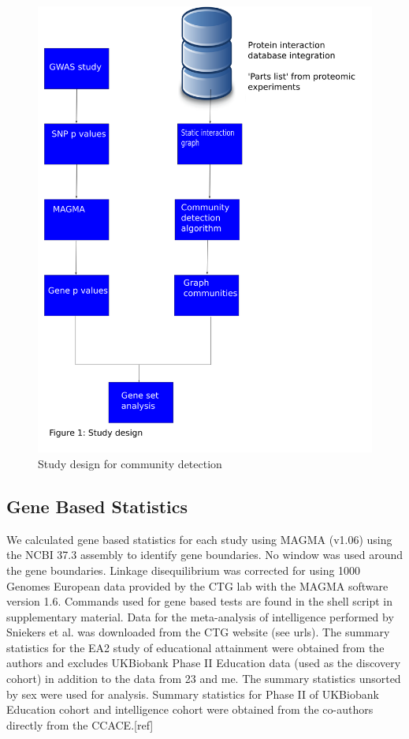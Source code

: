 \begin{figure}
    \centering
    \includegraphics[width=\textwidth]{images/study_design.png}  
    \caption{Study design for community detection}
    \label{fig:study design community detection}
\end{figure}
\subsection{Gene Based Statistics}
We calculated gene based statistics for each study using MAGMA (v1.06) using the NCBI 37.3 assembly to identify gene boundaries. \cite{de2015magma}   No window was used around the gene boundaries. Linkage disequilibrium was corrected for using 1000 Genomes European data provided by the CTG lab with the MAGMA software version 1.6.\cite{de2015magma}  Commands used for gene based tests are found in the shell script in supplementary material. Data for the meta-analysis of intelligence performed by Sniekers  et al. was downloaded from the CTG website (see urls). \cite{sniekers2017genome}  The summary statistics for the EA2 study of educational attainment were obtained from the authors and excludes UKBiobank Phase II Education data (used as the discovery cohort) in addition to the data from 23 and me. \cite{okbay2016genome}  The summary statistics unsorted by sex were used for analysis. Summary statistics for Phase II of UKBiobank Education cohort and intelligence cohort were obtained from the co-authors directly from the CCACE.[ref]

